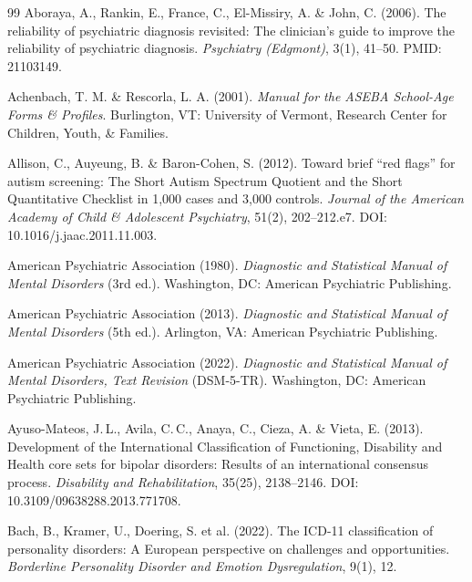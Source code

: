 \documentclass[11pt,a4paper]{article}
\begin{document}
\begin{thebibliography}{99}
Aboraya, A., Rankin, E., France, C., El-Missiry, A. \& John, C. (2006).
\newblock The reliability of psychiatric diagnosis revisited: The clinician's guide to improve the reliability of psychiatric diagnosis.
\newblock \textit{Psychiatry (Edgmont)}, 3(1), 41--50. PMID: 21103149.

Achenbach, T. M. \& Rescorla, L. A. (2001).
\newblock \textit{Manual for the ASEBA School-Age Forms \& Profiles}.
\newblock Burlington, VT: University of Vermont, Research Center for Children, Youth, \& Families.

Allison, C., Auyeung, B. \& Baron-Cohen, S. (2012).
\newblock Toward brief ``red flags'' for autism screening: The Short Autism Spectrum Quotient and the Short Quantitative Checklist in 1,000 cases and 3,000 controls.
\newblock \textit{Journal of the American Academy of Child \& Adolescent Psychiatry}, 51(2), 202--212.e7. DOI: 10.1016/j.jaac.2011.11.003.

American Psychiatric Association (1980).
\newblock \textit{Diagnostic and Statistical Manual of Mental Disorders} (3rd ed.).
\newblock Washington, DC: American Psychiatric Publishing.

American Psychiatric Association (2013).
\newblock \textit{Diagnostic and Statistical Manual of Mental Disorders} (5th ed.).
\newblock Arlington, VA: American Psychiatric Publishing.

American Psychiatric Association (2022).
\newblock \textit{Diagnostic and Statistical Manual of Mental Disorders, Text Revision} (DSM-5-TR).
\newblock Washington, DC: American Psychiatric Publishing.

Ayuso-Mateos, J.\,L., Avila, C.\,C., Anaya, C., Cieza, A. \& Vieta, E. (2013).
\newblock Development of the International Classification of Functioning, Disability and Health core sets for bipolar disorders: Results of an international consensus process.
\newblock \textit{Disability and Rehabilitation}, 35(25), 2138--2146. DOI: 10.3109/09638288.2013.771708.

Bach, B., Kramer, U., Doering, S. et al. (2022).
\newblock The ICD-11 classification of personality disorders: A European perspective on challenges and opportunities.
\newblock \textit{Borderline Personality Disorder and Emotion Dysregulation}, 9(1), 12.


\end{thebibliography}
\end{document}
